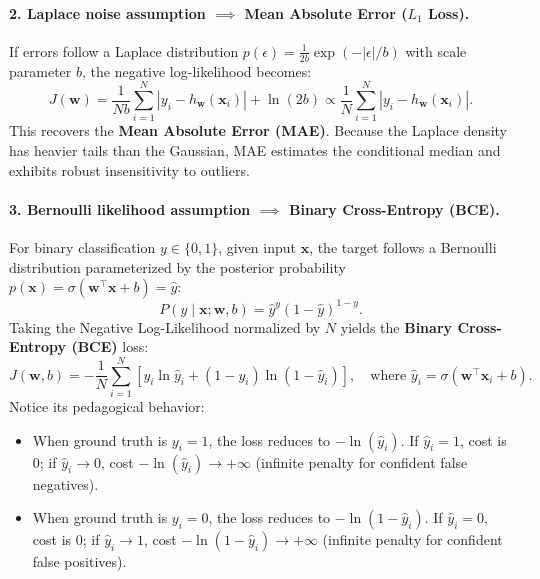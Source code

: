 \paragraph{2. Laplace noise assumption $\implies$ Mean Absolute Error ($L_1$ Loss).}
If errors follow a Laplace distribution $p(\epsilon) = \frac{1}{2b}\exp(-|\epsilon|/b)$ with scale parameter $b$, the negative log-likelihood becomes:
\begin{equation}
J(\mathbf{w}) = \frac{1}{N b} \sum_{i=1}^N |y_i - h_{\mathbf{w}}(\mathbf{x}_i)| + \ln(2b) \propto \frac{1}{N} \sum_{i=1}^N |y_i - h_{\mathbf{w}}(\mathbf{x}_i)|.
\label{eq:mae_mle_derivation}
\end{equation}
This recovers the \textbf{Mean Absolute Error (MAE)}. Because the Laplace density has heavier tails than the Gaussian, MAE estimates the conditional median and exhibits robust insensitivity to outliers.

\paragraph{3. Bernoulli likelihood assumption $\implies$ Binary Cross-Entropy (BCE).}
For binary classification $y \in \{0, 1\}$, given input $\mathbf{x}$, the target follows a Bernoulli distribution parameterized by the posterior probability $p(\mathbf{x}) = \sigma(\mathbf{w}^\top \mathbf{x} + b) = \hat{y}$:
\begin{equation}
P(y \mid \mathbf{x}; \mathbf{w}, b) = \hat{y}^y (1 - \hat{y})^{1 - y}.
\label{eq:bernoulli_pmf}
\end{equation}
Taking the Negative Log-Likelihood normalized by $N$ yields the \textbf{Binary Cross-Entropy (BCE)} loss:
\begin{equation}
J(\mathbf{w}, b) = -\frac{1}{N} \sum_{i=1}^N \left[ y_i \ln \hat{y}_i + (1 - y_i) \ln(1 - \hat{y}_i) \right], \quad \text{where } \hat{y}_i = \sigma(\mathbf{w}^\top \mathbf{x}_i + b).
\label{eq:binary_cross_entropy_cost}
\end{equation}
Notice its pedagogical behavior:
\begin{itemize}[noitemsep,topsep=2pt,parsep=0pt,partopsep=0pt]
  \item When ground truth is $y_i = 1$, the loss reduces to $-\ln(\hat{y}_i)$. If $\hat{y}_i = 1$, cost is $0$; if $\hat{y}_i \to 0$, cost $-\ln(\hat{y}_i) \to +\infty$ (infinite penalty for confident false negatives).
  \item When ground truth is $y_i = 0$, the loss reduces to $-\ln(1 - \hat{y}_i)$. If $\hat{y}_i = 0$, cost is $0$; if $\hat{y}_i \to 1$, cost $-\ln(1 - \hat{y}_i) \to +\infty$ (infinite penalty for confident false positives).
\end{itemize}

